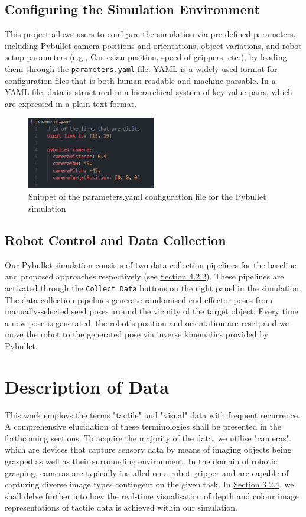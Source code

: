 \documentclass[11pt, a4paper]{report}
\begin{document}
\subsection{Configuring the Simulation Environment}\label{sec:3.1.2}
This project allows users to configure the simulation via pre-defined parameters, including Pybullet camera positions and orientations, object variations, and robot setup parameters (e.g., Cartesian position, speed of grippers, etc.), by loading them through the \verb|parameters.yaml| file. YAML is a widely-used format for configuration files that is both human-readable and machine-parsable. In a YAML file, data is structured in a hierarchical system of key-value pairs, which are expressed in a plain-text format.
\begin{figure}[H]
    \centering
    \includegraphics[width=0.5\textwidth]{docs/Project Report/Media/3_1_2_yaml.png}
    \caption{Snippet of the {parameters.yaml} configuration file for the Pybullet simulation}
    \label{fig:3.3}
\end{figure}


\subsection{Robot Control and Data Collection}\label{sec:3.1.3}
Our Pybullet simulation consists of two data collection pipelines for the baseline and proposed approaches respectively (see \hyperref[sec:4.2.2]{Section 4.2.2}). These pipelines are activated through the \verb|Collect Data| buttons on the right panel in the simulation. The data collection pipelines generate randomised end effector poses from manually-selected seed poses around the vicinity of the target object. Every time a new pose is generated, the robot's position and orientation are reset, and we move the robot to the generated pose via inverse kinematics provided by Pybullet.



\section{Description of Data}\label{sec:3.2}
This work employs the terms "tactile" and "visual" data with frequent recurrence. A comprehensive elucidation of these terminologies shall be presented in the forthcoming sections. To acquire the majority of the data, we utilise "cameras", which are devices that capture sensory data by means of imaging objects being grasped as well as their surrounding environment. In the domain of robotic grasping, cameras are typically installed on a robot gripper and are capable of capturing diverse image types contingent on the given task. In \hyperref[sec:3.2.4]{Section 3.2.4}, we shall delve further into how the real-time visualisation of depth and colour image representations of tactile data is achieved within our simulation.
\end{document}
